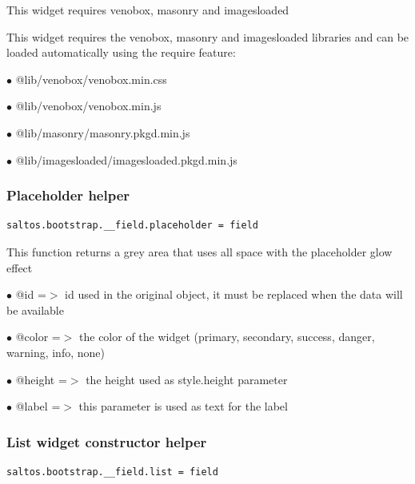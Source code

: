 \documentclass[a4paper]{article}
\begin{document}
This widget requires venobox, masonry and imagesloaded

This widget requires the venobox, masonry and imagesloaded libraries and can be loaded
automatically using the require feature:

\begin{compactitem}
\item[\color{myblue}$\bullet$] @lib/venobox/venobox.min.css
\item[\color{myblue}$\bullet$] @lib/venobox/venobox.min.js
\item[\color{myblue}$\bullet$] @lib/masonry/masonry.pkgd.min.js
\item[\color{myblue}$\bullet$] @lib/imagesloaded/imagesloaded.pkgd.min.js
\end{compactitem}

\hypertarget{toc85}{}
\subsubsection{Placeholder helper}

\begin{lstlisting}
saltos.bootstrap.__field.placeholder = field
\end{lstlisting}

This function returns a grey area that uses all space with the placeholder glow effect

\begin{compactitem}
\item[\color{myblue}$\bullet$] @id     =$>$ id used in the original object, it must be replaced when the data will be available
\item[\color{myblue}$\bullet$] @color  =$>$ the color of the widget (primary, secondary, success, danger, warning, info, none)
\item[\color{myblue}$\bullet$] @height =$>$ the height used as style.height parameter
\item[\color{myblue}$\bullet$] @label  =$>$ this parameter is used as text for the label
\end{compactitem}

\hypertarget{toc86}{}
\subsubsection{List widget constructor helper}

\begin{lstlisting}
saltos.bootstrap.__field.list = field
\end{lstlisting}
\end{document}
